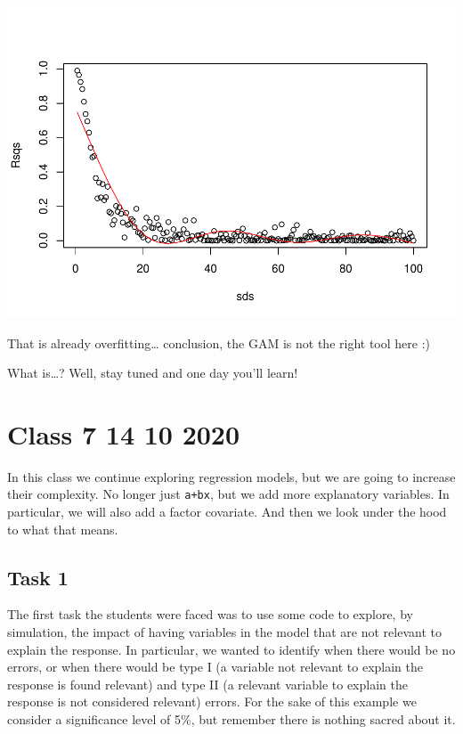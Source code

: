 \documentclass[
]{book}
\begin{document}
\includegraphics{ECOMODbook_files/figure-latex/a6.34-1.pdf}

That is already overfitting\ldots{} conclusion, the GAM is not the right tool here :)

What is\ldots? Well, stay tuned and one day you'll learn!

\hypertarget{aula7}{%
\chapter{Class 7 14 10 2020}\label{aula7}}

In this class we continue exploring regression models, but we are going to increase their complexity. No longer just \texttt{a+bx}, but we add more explanatory variables. In particular, we will also add a factor covariate. And then we look under the hood to what that means.

\hypertarget{task-1}{%
\section{Task 1}\label{task-1}}

The first task the students were faced was to use some code to explore, by simulation, the impact of having variables in the model that are not relevant to explain the response. In particular, we wanted to identify when there would be no errors, or when there would be type I (a variable not relevant to explain the response is found relevant) and type II (a relevant variable to explain the response is not considered relevant) errors. For the sake of this example we consider a significance level of 5\%, but remember there is nothing sacred about it.
\end{document}
